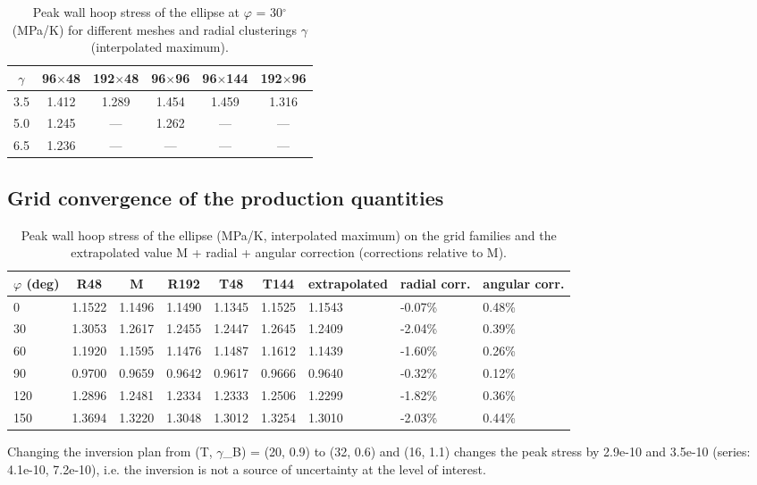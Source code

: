 \documentclass[preprint,12pt]{elsarticle}
\begin{document}
\begin{table}[htbp]
\centering
\caption{Peak wall hoop stress of the ellipse at $\varphi$ = 30$^{\circ}$ (MPa/K) for different meshes and radial clusterings $\gamma$ (interpolated maximum).}
\label{tab:6}
\begin{tabular}{cccccc}
\toprule
$\gamma$ & 96$\times$48 & 192$\times$48 & 96$\times$96 & 96$\times$144 & 192$\times$96 \\
\midrule
3.5 & 1.412 & 1.289 & 1.454 & 1.459 & 1.316 \\
5.0 & 1.245 & --- & 1.262 & --- & --- \\
6.5 & 1.236 & --- & --- & --- & --- \\
\bottomrule
\end{tabular}
\end{table}

\subsection{Grid convergence of the production quantities}
\label{sec:5.3}

\begin{table}[htbp]
\centering
\caption{Peak wall hoop stress of the ellipse (MPa/K, interpolated maximum) on the grid families and the extrapolated value M + radial + angular correction (corrections relative to M).}
\label{tab:7}
\begin{tabular}{lccccclll}
\toprule
$\varphi$ (deg) & R48 & M & R192 & T48 & T144 & extrapolated & radial corr. & angular corr. \\
\midrule
0 & 1.1522 & 1.1496 & 1.1490 & 1.1345 & 1.1525 & 1.1543 & -0.07\% & 0.48\% \\
30 & 1.3053 & 1.2617 & 1.2455 & 1.2447 & 1.2645 & 1.2409 & -2.04\% & 0.39\% \\
60 & 1.1920 & 1.1595 & 1.1476 & 1.1487 & 1.1612 & 1.1439 & -1.60\% & 0.26\% \\
90 & 0.9700 & 0.9659 & 0.9642 & 0.9617 & 0.9666 & 0.9640 & -0.32\% & 0.12\% \\
120 & 1.2896 & 1.2481 & 1.2334 & 1.2333 & 1.2506 & 1.2299 & -1.82\% & 0.36\% \\
150 & 1.3694 & 1.3220 & 1.3048 & 1.3012 & 1.3254 & 1.3010 & -2.03\% & 0.44\% \\
\bottomrule
\end{tabular}
\end{table}

Changing the inversion plan from (T, $\gamma$\_B) = (20, 0.9) to (32, 0.6) and (16, 1.1) changes the peak stress by 2.9e-10 and 3.5e-10 (series: 4.1e-10, 7.2e-10), i.e. the inversion is not a source of uncertainty at the level of interest.
\end{document}
